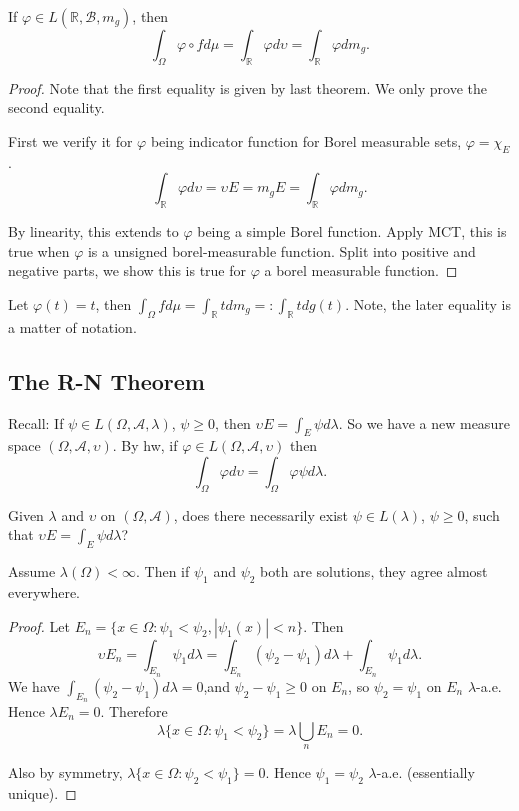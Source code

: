 \begin{corollary}
	If $\varphi \in L(\mathbb{R}, \mathcal{B}, m_g)$, then
	\[
		\int _\Omega \varphi \circ f d \mu = \int _{\mathbb{R}}\varphi d \upsilon = \int _{\mathbb{R}} \varphi d m_g
	.\] 
\end{corollary}
\begin{proof}
	Note that the first equality is given by last theorem. We only prove the second equality.

	First we verify it for $\varphi$ being indicator function for Borel measurable sets, $\varphi = \chi_E$. 
	\[
		\int _\mathbb{R} \varphi d \upsilon = \upsilon E = m_g E = \int _{\mathbb{R}} \varphi d m_g
	.\] 

	By linearity, this extends to $\varphi$ being a simple Borel function. Apply MCT, this is true when $\varphi$ is a unsigned borel-measurable function. Split into positive and negative parts, we show this is true for  $\varphi$ a borel measurable function.
\end{proof}

\begin{example}
	Let $\varphi(t) = t$, then $\int _\Omega f d \mu = \int _{\mathbb{R}} t d m_g =: \int _{\mathbb{R}} t d g(t)$. Note, the later equality is a matter of notation.
\end{example}

\subsection{The R-N Theorem}

Recall: If $\psi \in L(\Omega, \mathcal{A}, \lambda)$, $\psi \ge 0$, then $\upsilon E = \int _E \psi d \lambda$. So we have a new measure space $(\Omega, \mathcal{A}, \upsilon)$. By hw, if $\varphi \in L(\Omega, \mathcal{A}, \upsilon)$ then
\[
	\int _\Omega \varphi d \upsilon = \int _\Omega \varphi \psi d \lambda
.\] 

Given $\lambda$ and $\upsilon$ on $(\Omega, \mathcal{A})$, does there necessarily exist $\psi \in L(\lambda)$, $\psi \ge 0$, such that $\upsilon E = \int _E \psi d \lambda$?

\begin{proposition}
Assume $\lambda(\Omega) < \infty $. Then if $\psi_1$ and $\psi_2$ both are solutions, they agree almost everywhere.
\end{proposition}
\begin{proof}
	Let $E_n = \{x \in \Omega : \psi_1 < \psi _2, |\psi_1(x)| < n\} $. Then
	\[
		\upsilon E_n = \int _{E_n} \psi_1 d \lambda = \int _{E_n} (\psi_2 - \psi_1) d \lambda + \int _{E_n} \psi_1 d \lambda
	.\] 
	We have $\int _{E_n}\left(  \psi_2 - \psi_1 \right)  d \lambda = 0$,and $\psi_2 - \psi_1 \ge 0$ on $E_n$, so $\psi_2 = \psi_1$ on $E_n$ $\lambda$-a.e. Hence $\lambda E_n = 0$. Therefore
	\[
		\lambda \{x \in \Omega: \psi_1 < \psi_2\} = \lambda \bigcup_{n} E_n = 0 
	.\] 

	Also by symmetry, $\lambda \{ x \in \Omega: \psi_2 < \psi_1\}  = 0$.
	Hence $\psi_1 = \psi_2 $ $\lambda$-a.e. (essentially unique).
\end{proof}

